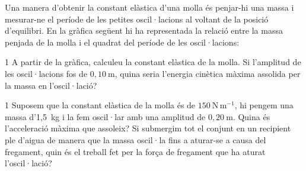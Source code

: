 Una manera d'obtenir la constant elàstica d'una molla és penjar-hi una massa i mesurar-ne el període de les petites oscil·lacions al voltant de la posició d'equilibri. En la gràfica següent hi ha representada la relació entre la massa penjada de la molla i el quadrat del període de les oscil·lacions:


\begin{apartat}{1}
A partir de la gràfica, calculeu la constant elàstica de la molla. Si l'amplitud de les oscil·lacions fos de $0,10\ \mathrm{m}$, quina seria l'energia cinètica màxima assolida per la massa en l'oscil·lació?
\end{apartat}

\begin{apartat}{1}
Suposem que la constant elàstica de la molla és de $150\ \mathrm{N\,m^{-1}}$, hi pengem una massa d'1,5~kg i la fem oscil·lar amb una amplitud de $0,20\ \mathrm{m}$. Quina és l'acceleració màxima que assoleix? Si submergim tot el conjunt en un recipient ple d'aigua de manera que la massa oscil·la fins a aturar-se a causa del fregament, quin és el treball fet per la força de fregament que ha aturat l'oscil·lació?
\end{apartat}
